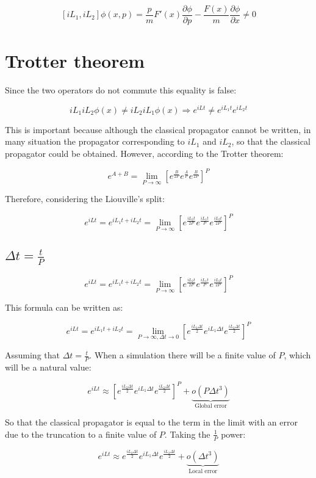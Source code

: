 	$$[iL_1, iL_2]\phi(x, p) = \frac{p}{m}F'(x)\frac{\partial \phi}{\partial p} -\frac{F(x)}{m}\frac{\partial \phi}{\partial x}\neq 0$$

\section{Trotter theorem}
Since the two operators do not commute this equality is false:

$$iL_1iL_2\phi(x)\neq iL_2iL_1\phi(x)\Rightarrow e^{iLt}\neq e^{iL_1t}e^{iL_2t}$$

This is important because although the classical propagator cannot be written, in many situation the propagator corresponding to $iL_1$ and $iL_2$, so that the classical propagator could be obtained.
However, according to the Trotter theorem:

$$e^{A+B} = \lim\limits_{P\rightarrow\infty}[e^{\frac{B}{2P}}e^{\frac{A}{P}}e^{\frac{B}{2P}}]^P$$

Therefore, considering the Liouville's split:

$$e^{iLt} = e^{iL_1t+iL_2t} = \lim\limits_{P\rightarrow\infty}[e^{\frac{iL_2t}{2P}}e^{\frac{iL_1t}{P}}e^{\frac{iL_2t}{2P}}]^P$$

	\subsection{$\Delta t = \frac{t}{P}$}

	$$e^{iLt} = e^{iL_1t+iL_2t} = \lim\limits_{P\rightarrow\infty}[e^{\frac{iL_2t}{2P}}e^{\frac{iL_1t}{P}}e^{\frac{iL_2t}{2P}}]^P$$

	This formula  can be written as:

	$$e^{iLt} = e^{iL_1t+iL_2t} = \lim\limits_{P\rightarrow\infty, \Delta t\rightarrow 0}[e^{\frac{iL_2\Delta t}{2}}e^{iL_1\Delta t}e^{\frac{iL_2\Delta t}{2}}]^P$$

	Assuming that $\Delta t = \frac{t}{P}$.
	When a simulation there will be a finite value of $P$, which will be a natural value:

	$$e^{iLt}\approx[e^{\frac{iL_2\Delta t}{2}}e^{iL_1\Delta t}e^{\frac{iL_2\Delta t}{2}}]^P + \underbrace{o(P\Delta t^3)}_{\text{Global error}}$$

	So that the classical propagator is equal to the term in the limit with an error due to the truncation to a finite value of $P$.
	Taking the $\frac{1}{P}$ power:

	$$e^{iLt}\approx e^{\frac{iL_2\Delta t}{2}}e^{iL_1\Delta t}e^{\frac{iL_2\Delta t}{2}} + \underbrace{o(\Delta t^3)}_{\text{Local error}}$$

